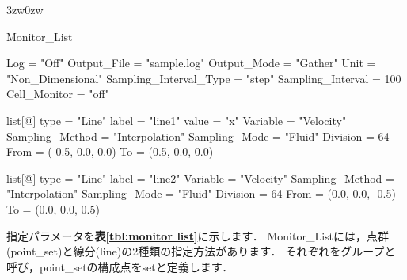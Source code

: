\begin{indentation}{3zw}{0zw}

{\small
\begin{program}
  Monitor_List {
    Log                    = "Off"
    Output_File            = "sample.log"
    Output_Mode            = "Gather"
    Unit                   = "Non_Dimensional"
    Sampling_Interval_Type = "step"
    Sampling_Interval      = 100
    Cell_Monitor           = "off"

    list[@] {
      type            = "Line"
      label           = "line1"
      value           = "x"
      Variable        = "Velocity"
      Sampling_Method = "Interpolation"
      Sampling_Mode   = "Fluid"
      Division        = 64
      From            = (-0.5, 0.0, 0.0)
      To              = (0.5, 0.0, 0.0)
    }

    list[@] {
      type            = "Line"
      label           = "line2"
      Variable        = "Velocity"
      Sampling_Method = "Interpolation"
      Sampling_Mode   = "Fluid"
      Division        = 64
      From            = (0.0, 0.0, -0.5)
      To              = (0.0, 0.0, 0.5)
    }
  }
\end{program}
}

指定パラメータを\textbf{表\ref{tbl:monitor list}}に示します．
Monitor\_Listには，点群(point\_set)と線分(line)の2種類の指定方法があります．
それぞれをグループと呼び，point\_setの構成点をsetと定義します．


\end{indentation}
